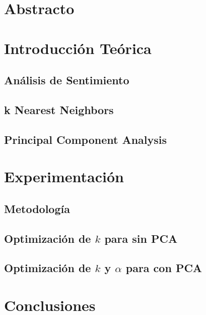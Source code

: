 \documentclass[11pt, a4paper]{article}
\begin{document}


\tableofcontents
\newpage

\section{Abstracto}%
\label{sec:abstracto}

\section{Introducción Teórica}%
\label{sec:introduccion_teorica}

\subsection{Análisis de Sentimiento}%
\label{sub:analisis_de_sentimiento}

\subsection{k Nearest Neighbors}%
\label{sub:k_nearest_neighbors}

\subsection{Principal Component Analysis}%
\label{sub:principal_component_analysis}

\section{Experimentación}%
\label{sec:experimentacion}

\subsection{Metodología}%
\label{sub:metodologia}

\subsection{Optimización de $k$ para \knn{} sin PCA}%
\label{sub:knn_sin_pca}

\subsection{Optimización de $k$ y $\alpha$ para \knn{} con PCA}%
\label{sub:alpha_k_knn_pca}

\section{Conclusiones}%
\label{sec:conclusiones}
\end{document}
